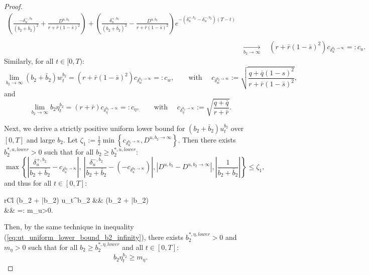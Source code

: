 \documentclass[11pt]{article}
\begin{document}
\begin{proof}
\begin{equation*}
\begin{split}
		{\displaystyle \left(\frac{- \delta^{-,b_2}_u}{(b_2 + \bar{b}_2)^2} + \frac{D^{u,b_2}}{r + \bar{r}(1-\bar{s})^2} \right) + \left(\frac{\delta^{+,b_2}_u}{(b_2 + \bar{b}_2)^2} - \frac{D^{u,b_2} }{r + \bar{r}(1-\bar{s})^2} \right)e^{- (\delta^{+,b_2}_u - \delta^{-,b_2}_u)(T-t)}  } \nonumber \\
		\\
		&\xrightarrow[b_2 \to \infty]{} \quad (r + \bar{r}(1-\bar{s})^2) c_{\delta_u^{b_2 \to \infty}}  =: c_u.
	\end{split}
	\end{equation*}
	Similarly, for all $t \in [0,T)$:
	$$\lim_{b_2 \to \infty} (b_2 + \bar{b}_2) w_t^{b_2} =  (r + \bar{r}(1-\bar{s})^2) c_{\delta_w^{b_2 \to \infty}} =: c_w,\qquad \text{with } \quad c_{\delta_w^{b_2 \to \infty}} := \sqrt{ \frac{q + \bar{q}(1-s)^2}{r + \bar{r}(1-\bar{s})^2} },$$
	and
	$$ \lim_{b_2 \to \infty}b_2 \eta_t^{b_2} = (r + \bar{r}) c_{\delta_{\eta}^{b_2 \to \infty}} =: c_\eta, \qquad \text{with } \quad c_{\delta_\eta^{b_2 \to \infty}} := \sqrt{ \frac{q + \bar{q}}{r +\bar{r}} }.$$
	
	Next, we derive a strictly positive uniform lower bound for $(b_2 + \bar{b}_2) u_t^{b_2}$ over $[0,T]$ and large $b_2$. Let $\zeta_1 :=\frac{1}{2} \min \left\{ c_{\delta_u^{b_2 \to \infty}}, D^{u,b_2 \to \infty} \right\}$. Then there exists $b_2^{*,u,lower}>0$ such that for all $b_2 \geq b_2^{*,u,lower}$:
	$$ 
	\max \left\{  \left\vert \frac{\delta_u^{+,b_2}}{b_2 + \bar{b}_2}  - c_{\delta_u^{b_2 \to \infty}} \right\vert, \   \left\vert \frac{\delta_u^{-,b_2}}{b_2 + \bar{b}_2}  - \left(-c_{\delta_u^{b_2 \to \infty}}\right) \right\vert, \left\vert D^{u,b_2} - D^{u,b_2\to \infty} \right\vert,  \left\vert \frac{1}{b_2 + \bar{b}_2} \right\vert  \right\} \leq \zeta_1,
	$$ 
	and thus for all $t \in [0,T]$:
	\begin{IEEEeqnarray}{rCl}
		(b_2 + \bar{b}_2) u_t^{b_2} &\geq&  (b_2 + \bar{b}_2)  \nonumber \\
		&\geq&  =: m_u>0.
	\label{eq:ut_uniform_lower_bound_b2_infinity}
	\end{IEEEeqnarray}
	Then, by the same technique in inequality (\ref{eq:ut_uniform_lower_bound_b2_infinity}), there exists $b_2^{*,\eta, lower} > 0$ and $m_\eta >0$ such that for all $b_2 \geq b_2^{*,\eta,lower}$ and all $t\in[0,T]$:
	\begin{equation}
	   b_2 \eta_t^{b_2} \geq m_\eta.
	\label{eq:eta_t_uniform_lower_bound_b2_infinity}
	\end{equation}


\end{proof}
\end{document}
